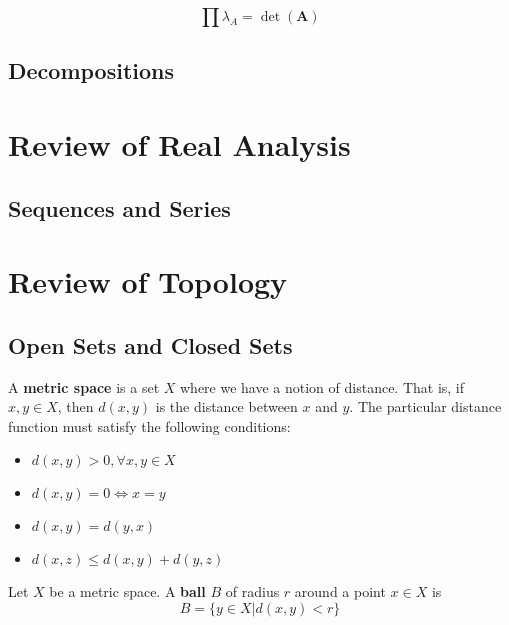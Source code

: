 			\begin{corollary}
				\begin{equation}
					\prod \lambda_A = \det(\mathbf{A})
				\end{equation}
			\end{corollary}



		\section{Decompositions}

	\chapter{Review of Real Analysis}
		\section{Sequences and Series}

	\chapter{Review of Topology}
		\section{Open Sets and Closed Sets}
			\begin{definition}
				A \textbf{metric space} is a set $X$ where we have a notion of distance. That is, if $x, y \in X$, then $d(x, y)$ is the distance between $x$ and $y$. The particular distance function must satisfy the following conditions:
				\begin{itemize}
					\item $d(x, y) > 0, \forall x, y \in X$
					\item $d(x, y) = 0 \iff x=y$
					\item $d(x, y) = d(y, x)$
					\item $d(x, z) \le d(x, y) + d(y, z)$
				\end{itemize}
			\end{definition}

			\begin{definition}[Ball]
				Let $X$ be a metric space. A \textbf{ball} $B$ of radius $r$ around a point $x \in X$ is
				\begin{equation}
					B = \{y \in X|d(x, y) < r\}
				\end{equation}
			\end{definition}

